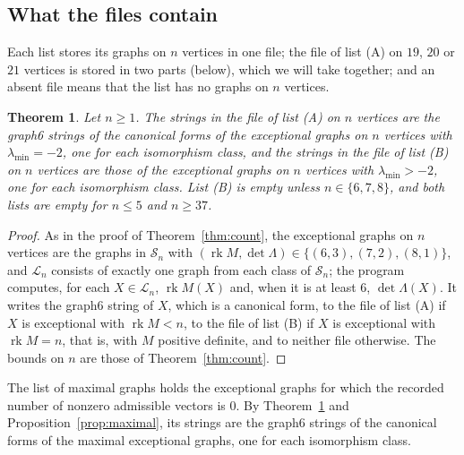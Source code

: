 \documentclass[11pt]{article}
\newcommand\cL{{\mathcal L}}
\newcommand\cS{{\mathcal S}}
\newcommand\opk[1]{\mathop{\mathrm{#1}}\nolimits}
\newcommand\rk{\opk{rk}}
\newtheorem{theorem}{Theorem}[section]
\theoremstyle{definition}
\newcommand{\lmin}{\lambda_{\min}}
\begin{document}
\subsection*{What the files contain}
Each list stores its graphs on $n$ vertices in one file; the file of list (A) on $19$, $20$ or
$21$ vertices is stored in two parts (below), which we will take together; and an absent file
means that the list has no graphs on $n$ vertices.

\begin{theorem}\label{thm:main}
Let $n\ge1$. The strings in the file of list (A) on $n$ vertices are the graph6 strings of the
canonical forms of the exceptional graphs on $n$ vertices with $\lmin=-2$, one for each
isomorphism class, and the strings in the file of list (B) on $n$ vertices are those of the
exceptional graphs on $n$ vertices with $\lmin>-2$, one for each isomorphism class. List (B) is
empty unless $n\in\{6,7,8\}$, and both lists are empty for $n\le5$ and $n\ge37$.
\end{theorem}

\begin{proof}
As in the proof of Theorem~\ref{thm:count}, the exceptional graphs on $n$ vertices are the graphs
in $\cS_n$ with $(\rk M,\det\Lambda)\in\{(6,3),(7,2),(8,1)\}$, and $\cL_n$ consists of exactly
one graph from each class of $\cS_n$; the program computes, for each $X\in\cL_n$, $\rk M(X)$ and,
when it is at least $6$, $\det\Lambda(X)$. It writes the graph6 string of $X$, which is a
canonical form, to the file of list (A) if $X$ is exceptional with $\rk M<n$, to the file of list
(B) if $X$ is exceptional with $\rk M=n$, that is, with $M$ positive definite, and to neither
file otherwise. The bounds on $n$ are those of Theorem~\ref{thm:count}.
\end{proof}

The list of maximal graphs holds the exceptional graphs for which the recorded number of nonzero
admissible vectors is $0$. By Theorem~\ref{thm:main} and Proposition~\ref{prop:maximal}, its
strings are the graph6 strings of the canonical forms of the maximal exceptional graphs, one for
each isomorphism class.
\end{document}

